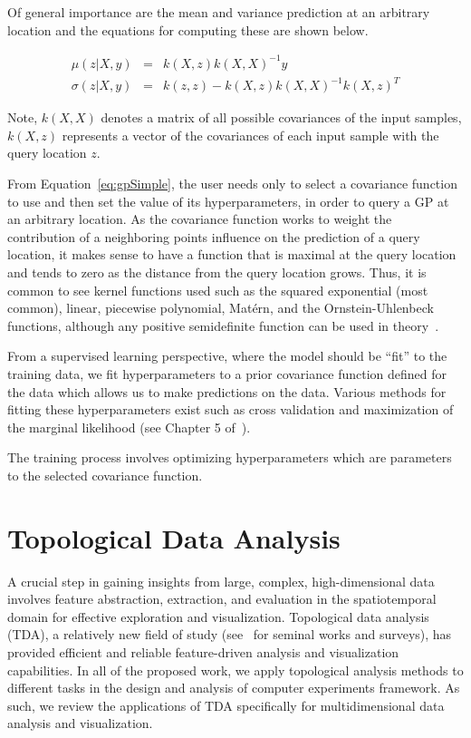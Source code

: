 Of general importance are the mean and variance prediction at an arbitrary location and the equations for computing these are shown below.

\begin{eqnarray}
\mu(z|X,y) & = & k(X,z)k(X,X)^{-1}y\\
\sigma(z|X,y) & = & k(z,z) - k(X,z)k(X,X)^{-1}k(X,z)^T
\end{eqnarray}

Note, $k(X,X)$ denotes a matrix of all possible covariances of the input samples, $k(X,z)$ represents a vector of the covariances of each input sample with the query location $z$.

From Equation~\ref{eq:gpSimple}, the user needs only to select a covariance function to use and then set the value of its hyperparameters, in order to query a GP at an arbitrary location.
%
As the covariance function works to weight the contribution of a neighboring points influence on the prediction of a query location, it makes sense to have a function that is maximal at the query location and tends to zero as the distance from the query location grows.
%
Thus, it is common to see kernel functions used such as the squared exponential (most common), linear, piecewise polynomial, Mat\'{e}rn, and the Ornstein-Uhlenbeck functions, although any positive semidefinite function can be used in theory~\cite{RasmussenWilliams2006}.

From a supervised learning perspective, where the model should be ``fit'' to the training data, we fit hyperparameters to a prior covariance function defined for the data which allows us to make predictions on the data.
%
Various methods for fitting these hyperparameters exist such as cross validation and maximization of the marginal likelihood (see Chapter 5 of~\cite{RasmussenWilliams2006}).

The training process involves optimizing hyperparameters which are parameters to the selected covariance function.

\section{Topological Data Analysis}
A crucial step in gaining insights from large, complex, high-dimensional data involves feature abstraction, extraction, and evaluation in the spatiotemporal domain for effective exploration and visualization.
%
Topological data analysis (TDA), a relatively new field of study (see~\cite{EdsbrunnerHarer2010,Zomorodian2005,BiasottisDeFlorianiFalcidieno2008,Carlsson2009,EdelsbrunnerHarer2008, Ghrist2009} for seminal works and surveys), has provided efficient and reliable feature-driven analysis and visualization capabilities.
%
In all of the proposed work, we apply topological analysis methods to different tasks in the design and analysis of computer experiments framework.
%
As such, we review the applications of TDA specifically for multidimensional data analysis and visualization.

